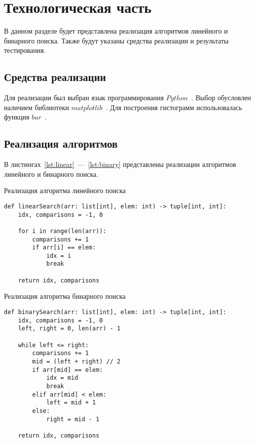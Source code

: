 \section{Технологическая часть}

В данном разделе будет представлена реализация алгоритмов линейного и бинарного поиска. Также будут указаны средства реализации и результаты тестирования.

\subsection{Средства реализации}

Для реализации был выбран язык программирования $Python$~\cite{python}. Выбор обусловлен наличием библиотеки $matplotlib$~\cite{matplotlib}. Для построения гистограмм использовалась функция $bar$~\cite{bar}. 

\subsection{Реализация алгоритмов}

В листингах~\ref{lst:linear}~---~\ref{lst:binary} представлены реализации алгоритмов линейного и бинарного поиска.

\begin{listing}[H]
\caption{Реализация алгоритма линейного поиска}
\label{lst:linear}
\begin{verbatim}
def linearSearch(arr: list[int], elem: int) -> tuple[int, int]:
    idx, comparisons = -1, 0

    for i in range(len(arr)):
        comparisons += 1
        if arr[i] == elem:
            idx = i
            break
    
    return idx, comparisons
\end{verbatim}
\end{listing}

\begin{listing}[H]
\caption{Реализация алгоритма бинарного поиска}
\label{lst:binary}
\begin{verbatim}
def binarySearch(arr: list[int], elem: int) -> tuple[int, int]:
    idx, comparisons = -1, 0
    left, right = 0, len(arr) - 1

    while left <= right:
        comparisons += 1
        mid = (left + right) // 2            
        if arr[mid] == elem:
            idx = mid
            break
        elif arr[mid] < elem:
            left = mid + 1
        else:
            right = mid - 1

    return idx, comparisons
\end{verbatim}
\end{listing}

